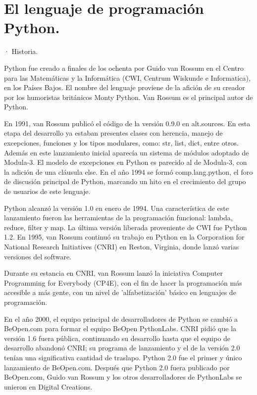 \section{El lenguaje de programación Python.}

· Historia.

Python fue creado a finales de los ochenta por Guido van Rossum en el Centro para las Matemáticas y la Informática (CWI, Centrum Wiskunde e Informatica), en los Países Bajos.
El nombre del lenguaje proviene de la afición de su creador por los humoristas británicos Monty Python.
Van Rossum es el principal autor de Python.

En 1991, van Rossum publicó el código de la versión 0.9.0 en alt.sources. En esta etapa del desarrollo ya estaban presentes clases con herencia, manejo de excepciones, funciones y los tipos modulares, como: str, list, dict, entre otros. Además en este lanzamiento inicial aparecía un sistema de módulos adoptado de Modula-3. El modelo de excepciones en Python es parecido al de Modula-3, con la adición de una cláusula else. En el año 1994 se formó comp.lang.python, el foro de discusión principal de Python, marcando un hito en el crecimiento del grupo de usuarios de este lenguaje.

Python alcanzó la versión 1.0 en enero de 1994. Una característica de este lanzamiento fueron las herramientas de la programación funcional: lambda, reduce, filter y map.
La última versión liberada proveniente de CWI fue Python 1.2. En 1995, van Rossum continuó su trabajo en Python en la Corporation for National Research Initiatives (CNRI) en Reston, Virginia, donde lanzó varias versiones del software.

Durante su estancia en CNRI, van Rossum lanzó la iniciativa Computer Programming for Everybody (CP4E), con el fin de hacer la programación más accesible a más gente, con un nivel de 'alfabetización' básico en lenguajes de programación.

En el año 2000, el equipo principal de desarrolladores de Python se cambió a BeOpen.com para formar el equipo BeOpen PythonLabs. CNRI pidió que la versión 1.6 fuera pública, continuando su desarrollo hasta que el equipo de desarrollo abandonó CNRI; su programa de lanzamiento y el de la versión 2.0 tenían una significativa cantidad de traslapo.​ Python 2.0 fue el primer y único lanzamiento de BeOpen.com. Después que Python 2.0 fuera publicado por BeOpen.com, Guido van Rossum y los otros desarrolladores de PythonLabs se unieron en Digital Creations.


